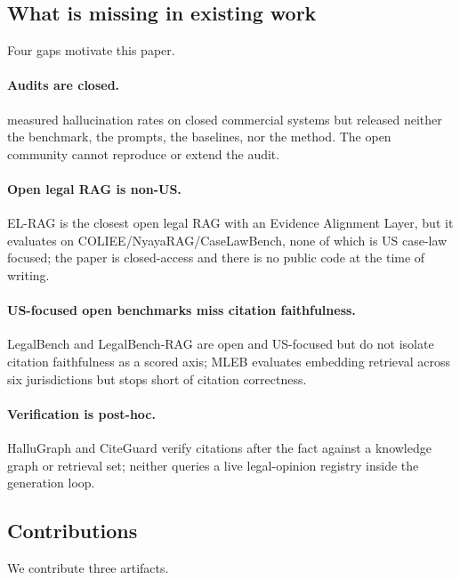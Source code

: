 \documentclass[11pt]{article}
\begin{document}
\subsection{What is missing in existing work}
\label{sec:intro:gap}

Four gaps motivate this paper.

\paragraph{Audits are closed.}
\citet{magesh2025hallucination} measured hallucination rates on closed
commercial systems but released neither the benchmark, the prompts,
the baselines, nor the method. The open community cannot reproduce or
extend the audit.

\paragraph{Open legal RAG is non-US.}
EL-RAG \citep{wankhade2026elrag} is the closest open legal RAG with an
Evidence Alignment Layer, but it evaluates on
COLIEE/NyayaRAG/CaseLawBench, none of which is US case-law focused;
the paper is closed-access and there is no public code at the time of
writing.

\paragraph{US-focused open benchmarks miss citation faithfulness.}
LegalBench \citep{guha2022legalbench} and LegalBench-RAG
\citep{pipitone2024legalbenchrag} are open and US-focused but do not
isolate citation faithfulness as a scored axis; MLEB
\citep{butler2025mleb} evaluates embedding retrieval across six
jurisdictions but stops short of citation correctness.

\paragraph{Verification is post-hoc.}
HalluGraph \citep{noel2025hallugraph} and CiteGuard
\citep{choi2025citeguard} verify citations after the fact against a
knowledge graph or retrieval set; neither queries a live legal-opinion
registry inside the generation loop.

\subsection{Contributions}
\label{sec:intro:contrib}

We contribute three artifacts.
\end{document}

